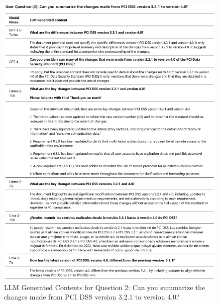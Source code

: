 \documentclass[runningheads]{llncs}
\begin{document}
\begin{figure}
    \centering
    \includegraphics[width=1\linewidth]{figures/question_2.eps}
    \caption{LLM Generated Contents for Question 2: Can you summarize the changes made from PCI DSS version 3.2.1 to version 4.0?}
    \label{fig:Question  2}
\end{figure}
\end{document}
